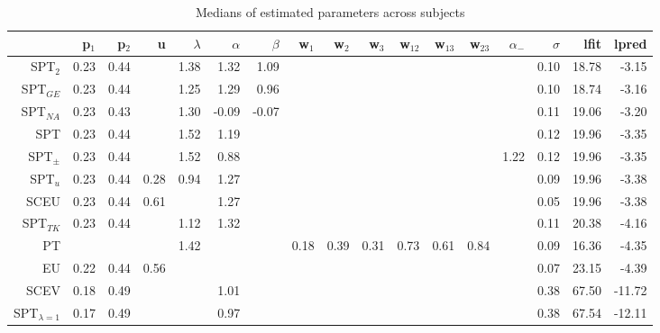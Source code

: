 \begin{table}[!htb]
\centering
\begin{tabular}{rrrrrrrrrrrrrrrrr}
  \hline
 & p$_{1}$ & p$_{2}$ & u & $\lambda$ & $\alpha$ & $\beta$ & w$_{1}$ & w$_{2}$ & w$_{3}$ & w$_{12}$ & w$_{13}$ & w$_{23}$ & $\alpha_{-}$ & $\sigma$ & lfit & lpred \\ 
  \hline
SPT$_{2}$ & 0.23 & 0.44 &  & 1.38 & 1.32 & 1.09 &  &  &  &  &  &  &  & 0.10 & 18.78 & -3.15 \\ 
  SPT$_{GE}$ & 0.23 & 0.44 &  & 1.25 & 1.29 & 0.96 &  &  &  &  &  &  &  & 0.10 & 18.74 & -3.16 \\ 
  SPT$_{NA}$ & 0.23 & 0.43 &  & 1.30 & -0.09 & -0.07 &  &  &  &  &  &  &  & 0.11 & 19.06 & -3.20 \\ 
  SPT & 0.23 & 0.44 &  & 1.52 & 1.19 &  &  &  &  &  &  &  &  & 0.12 & 19.96 & -3.35 \\ 
  SPT$_{\pm}$ & 0.23 & 0.44 &  & 1.52 & 0.88 &  &  &  &  &  &  &  & 1.22 & 0.12 & 19.96 & -3.35 \\ 
  SPT$_{u}$ & 0.23 & 0.44 & 0.28 & 0.94 & 1.27 &  &  &  &  &  &  &  &  & 0.09 & 19.96 & -3.38 \\ 
  SCEU & 0.23 & 0.44 & 0.61 &  & 1.27 &  &  &  &  &  &  &  &  & 0.05 & 19.96 & -3.38 \\ 
  SPT$_{TK}$ & 0.23 & 0.44 &  & 1.12 & 1.32 &  &  &  &  &  &  &  &  & 0.11 & 20.38 & -4.16 \\ 
  PT &  &  &  & 1.42 &  &  & 0.18 & 0.39 & 0.31 & 0.73 & 0.61 & 0.84 &  & 0.09 & 16.36 & -4.35 \\ 
  EU & 0.22 & 0.44 & 0.56 &  &  &  &  &  &  &  &  &  &  & 0.07 & 23.15 & -4.39 \\ 
  SCEV & 0.18 & 0.49 &  &  & 1.01 &  &  &  &  &  &  &  &  & 0.38 & 67.50 & -11.72 \\ 
  SPT$_{\lambda = 1}$ & 0.17 & 0.49 &  &  & 0.97 &  &  &  &  &  &  &  &  & 0.38 & 67.54 & -12.11 \\ 
   \hline
\end{tabular}
\caption{Medians of estimated parameters across subjects} 
\label{table_A1_median_pars}
\end{table}
